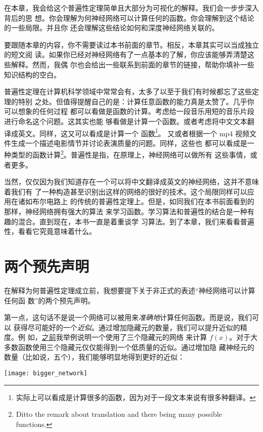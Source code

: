 在本章，我会给这个普遍性定理简单且大部分为可视化的解释。我们会一步步深入背后的思
想。你会理解为何神经网络可以计算任何的函数。你会理解到这个结论的一些局限。并且你
还会理解这些结论如何和深度神经网络关联的。

要跟随本章的内容，你不需要读过本书前面的章节。相反，本章其实可以当成独立的短文阅
读。如果你已经对神经网络有了一点基本的了解，你应该能够弄清楚这些解释。然而，我偶
尔也会给出一些联系到前面的章节的链接，帮助你填补一些知识结构的空白。

普遍性定理在计算机科学领域中常常会有，太多了以至于我们有时候都忘了这些定理的特别
之处。但值得提醒自己的是：计算任意函数的能力真是太赞了。几乎你可以想象的任何过程
都可以看做是函数的计算。考虑给一段音乐用短的音乐片段进行命名这个问题。这其实也能
够看做是计算一个函数。或者考虑将中文文本翻译成英文。同样，这又可以看成是计算一个
函数\footnote{实际上可以看成是计算很多的函数，因为对于一段文本来说有很多种翻译。}。
又或者根据一个 mp4 视频文件生成一个描述电影情节并讨论表演质量的问题。同样，这些也
都可以看成是一种类型的函数计算\footnote{Ditto the remark about translation and
  there being many possible functions.}。普遍性是指，在原理上，神经网络可以做所有
这些事情，或者更多。

当然，仅仅因为我们知道存在一个可以将中文翻译成英文的神经网络，这并不意味着我们有
了一种构造甚至识别出这样的网络的很好的技术。这个局限同样可以应用在诸如布尔电路上
的传统的普遍性定理上。但是，如同我们在本书前面看到的那样，神经网络拥有强大的算法
来学习函数。学习算法和普遍性的结合是一种有趣的混合。直到现在，本书一直是着重谈学
习算法。到了本章，我们来看看普遍性，看看它究竟意味着什么。

\section{两个预先声明}
\label{sec:two_caveats}

在解释为何普遍性定理成立前，我想要提下关于非正式的表述``神经网络可以计算任何函
数''的两个预先声明。

第一点，这句话不是说一个网络可以被用来\emph{准确地}计算任何函数。而是说，我们可以
获得尽可能好的一个\emph{近似}。通过增加隐藏元的数量，我们可以提升近似的精度。例
如，\hyperref[basic_network_precursor]{之前}我举例说明一个使用了三个隐藏元的网络
来计算 $f(x)$。对于大多数函数使用三个隐藏元仅仅能得到一个低质量的近似。通过增加隐
藏神经元的数量（比如说，五个），我们能够明显地得到更好的近似：
\begin{center}
  \texttt{[image: bigger\_network]}
\end{center}

